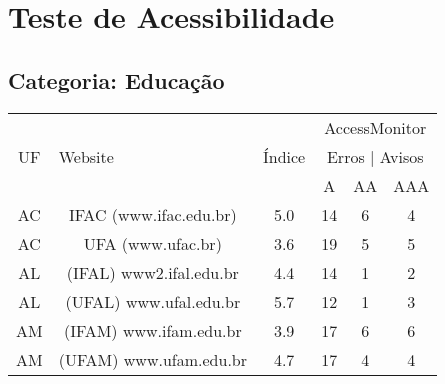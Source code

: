 \chapter{Teste de Acessibilidade}
\label{sec:apendiceTestedeAcessibilidade}

\section{Categoria: Educação}
\label{sec:apendiceeducacao}

\begin{center}
\begin{longtable}{|c|l|l|l|l|l|}
\hline
    \multirow{3}{4pt}{\centerline{UF}} & 
    \multirow{3}{253pt}{\centerline{Website}} & 
    \multirow{3}{30pt}{\centerline{Índice}} &
    \multicolumn{3}{c|}{AccessMonitor} \\ 
\cline{4-6}
\multicolumn{1}{|c|}{} & \multicolumn{1}{c|}{} & \multicolumn{1}{c|}{} & \multicolumn{3}{c|}{Erros | Avisos} \\ 
\cline{4-6}
\multicolumn{1}{|c|}{} & \multicolumn{1}{c|}{} & \multicolumn{1}{c|}{} & \multicolumn{1}{c|}{A} & \multicolumn{1}{c|}{AA} & \multicolumn{1}{c|}{AAA} \\ 
\hline
\multicolumn{1}{|c|}{AC} & \multicolumn{1}{c|}{ IFAC (www.ifac.edu.br)} & \multicolumn{1}{c|}{5.0} & \multicolumn{1}{c|}{14} & \multicolumn{1}{c|}{6} & \multicolumn{1}{c|}{4} \\ 
\hline
\multicolumn{1}{|c|}{AC} & \multicolumn{1}{c|}{UFA (www.ufac.br)} & \multicolumn{1}{c|}{3.6} & \multicolumn{1}{c|}{19} & \multicolumn{1}{c|}{5} & \multicolumn{1}{c|}{5} \\ 
\hline
\multicolumn{1}{|c|}{AL} & \multicolumn{1}{c|}{(IFAL) www2.ifal.edu.br} & \multicolumn{1}{c|}{4.4} & \multicolumn{1}{c|}{14} & \multicolumn{1}{c|}{1} & \multicolumn{1}{c|}{2} \\ 
\hline
\multicolumn{1}{|c|}{AL} & \multicolumn{1}{c|}{(UFAL) www.ufal.edu.br} & \multicolumn{1}{c|}{5.7} & \multicolumn{1}{c|}{12} & \multicolumn{1}{c|}{1} & \multicolumn{1}{c|}{3} \\ 
\hline
\multicolumn{1}{|c|}{AM} & \multicolumn{1}{c|}{(IFAM) www.ifam.edu.br} & \multicolumn{1}{c|}{3.9} & \multicolumn{1}{c|}{17} & \multicolumn{1}{c|}{6} & \multicolumn{1}{c|}{6} \\ 
\hline
\multicolumn{1}{|c|}{AM} & \multicolumn{1}{c|}{(UFAM) www.ufam.edu.br} & \multicolumn{1}{c|}{4.7} & \multicolumn{1}{c|}{17} & \multicolumn{1}{c|}{4} & \multicolumn{1}{c|}{4} \\ 

\end{longtable}
\end{center}
